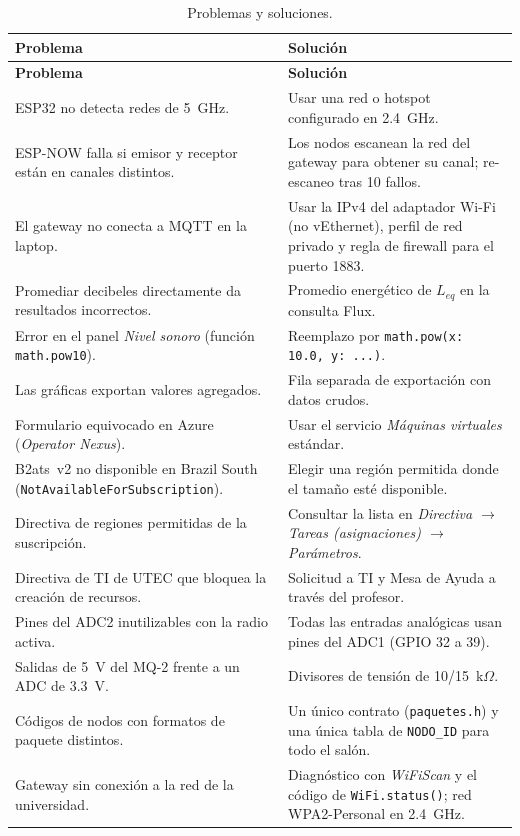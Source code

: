 \documentclass[11pt,a4paper]{article}
\newcommand{\arch}[1]{\texttt{#1}}
\begin{document}
\begin{longtable}{@{}p{}p{}@{}}
\caption{Problemas y soluciones.}\\
\toprule
\textbf{Problema} & \textbf{Soluci\'on} \\
\midrule
\endfirsthead
\toprule
\textbf{Problema} & \textbf{Soluci\'on} \\
\midrule
\endhead
ESP32 no detecta redes de 5~GHz. & Usar una red o hotspot configurado en 2.4~GHz. \\
ESP-NOW falla si emisor y receptor est\'an en canales distintos. & Los nodos escanean la red
del gateway para obtener su canal; re-escaneo tras 10 fallos. \\
El gateway no conecta a MQTT en la laptop. & Usar la IPv4 del adaptador Wi-Fi (no
vEthernet), perfil de red privado y regla de firewall para el puerto 1883. \\
Promediar decibeles directamente da resultados incorrectos. & Promedio energ\'etico de
$L_{eq}$ en la consulta Flux. \\
Error en el panel \emph{Nivel sonoro} (funci\'on \texttt{math.pow10}). & Reemplazo por
\texttt{math.pow(x: 10.0, y: ...)}. \\
Las gr\'aficas exportan valores agregados. & Fila separada de exportaci\'on con datos
crudos. \\
Formulario equivocado en Azure (\emph{Operator Nexus}). & Usar el servicio
\emph{M\'aquinas virtuales} est\'andar. \\
B2ats~v2 no disponible en Brazil South
(\texttt{NotAvailableForSubscription}). & Elegir una regi\'on permitida donde el tama\~no
est\'e disponible. \\
Directiva de regiones permitidas de la suscripci\'on. & Consultar la lista en
\emph{Directiva $\rightarrow$ Tareas (asignaciones) $\rightarrow$ Par\'ametros}. \\
Directiva de TI de UTEC que bloquea la creaci\'on de recursos. & Solicitud a TI y Mesa de
Ayuda a trav\'es del profesor. \\
Pines del ADC2 inutilizables con la radio activa. & Todas las entradas anal\'ogicas usan pines
del ADC1 (GPIO 32 a 39). \\
Salidas de 5~V del MQ-2 frente a un ADC de 3.3~V. & Divisores de tensi\'on de 10/15~k$\Omega$. \\
C\'odigos de nodos con formatos de paquete distintos. & Un \'unico contrato (\arch{paquetes.h}) y
una \'unica tabla de \texttt{NODO\_ID} para todo el sal\'on. \\
Gateway sin conexi\'on a la red de la universidad. & Diagn\'ostico con \emph{WiFiScan} y el c\'odigo
de \texttt{WiFi.status()}; red WPA2-Personal en 2.4~GHz. \\
\bottomrule
\end{longtable}
\end{document}
